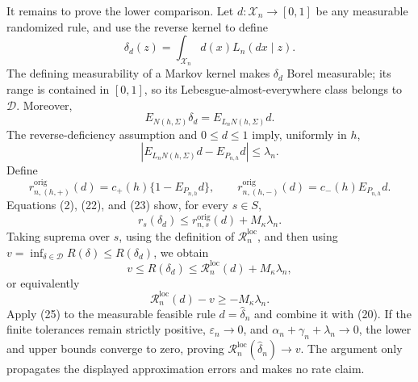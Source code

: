 It remains to prove the lower comparison. Let \(d:\mathcal X_n\to[0,1]\) be any measurable randomized rule, and use the reverse kernel to define
\[
 \delta_d(z)=\int_{\mathcal X_n}d(x)L_n(dx\mid z). \tag{21}
\]
The defining measurability of a Markov kernel makes \(\delta_d\) Borel measurable; its range is contained in \([0,1]\), so its Lebesgue-almost-everywhere class belongs to \(\mathcal D\). Moreover,
\[
 E_{N(h,\Sigma)}\delta_d
 =E_{L_nN(h,\Sigma)}d. \tag{22}
\]
The reverse-deficiency assumption and \(0\leq d\leq1\) imply, uniformly in \(h\),
\[
 \left\lvert E_{L_nN(h,\Sigma)}d-E_{P_{n,h}}d\right\rvert
 \leq\lambda_n. \tag{23}
\]
Define
\[
 r^{\mathrm{orig}}_{n,(h,+)}(d)
 =c_+(h)\{1-E_{P_{n,h}}d\},
 \qquad
 r^{\mathrm{orig}}_{n,(h,-)}(d)
 =c_-(h)E_{P_{n,h}}d.
\]
Equations (2), (22), and (23) show, for every \(s\in S\),
\[
 r_s(\delta_d)
 \leq r^{\mathrm{orig}}_{n,s}(d)+M_{\kappa}\lambda_n. \tag{24}
\]
Taking suprema over \(s\), using the definition of \(\mathcal R_n^{\mathrm{loc}}\), and then using \(v=\inf_{\delta\in\mathcal D}R(\delta)\leq R(\delta_d)\), we obtain
\[
 v\leq R(\delta_d)
 \leq\mathcal R_n^{\mathrm{loc}}(d)+M_{\kappa}\lambda_n,
\]
or equivalently
\[
 \mathcal R_n^{\mathrm{loc}}(d)-v\geq-M_{\kappa}\lambda_n. \tag{25}
\]
Apply (25) to the measurable feasible rule \(d=\widehat\delta_n\) and combine it with (20). If the finite tolerances remain strictly positive, \(\varepsilon_n\to0\), and \(\alpha_n+\gamma_n+\lambda_n\to0\), the lower and upper bounds converge to zero, proving \(\mathcal R_n^{\mathrm{loc}}(\widehat\delta_n)\to v\). The argument only propagates the displayed approximation errors and makes no rate claim.
